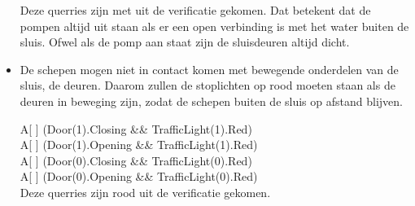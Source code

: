\documentclass{article}
\begin{document}
\begin{itemize}
Deze querries zijn met {\color{green}{groen}} uit de verificatie gekomen. Dat betekent dat de pompen altijd uit staan als er een open verbinding is met het water buiten de sluis. Ofwel als de pomp aan staat zijn de sluisdeuren altijd dicht.

\item De schepen mogen niet in contact komen met bewegende onderdelen van de sluis, de deuren. Daarom zullen de stoplichten op rood moeten staan als de deuren in beweging zijn, zodat de schepen buiten de sluis op afstand blijven.

{\center
A[ ] (Door(1).Closing \&\& TrafficLight(1).Red)\\
A[ ] (Door(1).Opening \&\& TrafficLight(1).Red)\\
A[ ] (Door(0).Closing \&\& TrafficLight(0).Red)\\
A[ ] (Door(0).Opening \&\& TrafficLight(0).Red)\\
}
Deze querries zijn {\color{red}rood} uit de verificatie gekomen. 
\end{itemize}





\clearpage %
\end{document}

